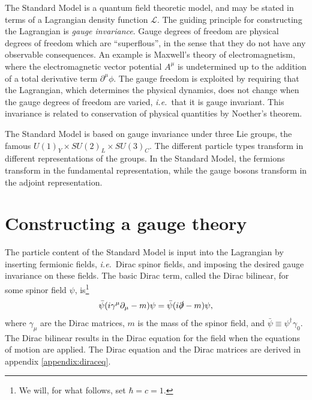 \documentclass[twoside,english]{uiofysmaster}
\begin{document}
The Standard Model is a quantum field theoretic model, and may be stated in terms of a Lagrangian density function $\mathcal{L}$. The guiding principle for constructing the Lagrangian is {\it gauge invariance}. Gauge degrees of freedom are physical degrees of freedom which are ``superflous'', in the sense that they do not have any observable consequences. An example is Maxwell's theory of electromagnetism, where the electromagnetic vector potential $A^\mu$ is undetermined up to the addition of a total derivative term $\partial^\mu \phi$. The gauge freedom is exploited by requiring that the Lagrangian, which determines the physical dynamics, does not change when the gauge degrees of freedom are varied, {\it i.e.}\ that it is gauge invariant. This invariance is related to conservation of physical quantities by Noether's theorem.

The Standard Model is based on gauge invariance under three Lie groups, the famous $U(1)_Y\times SU(2)_L\times SU(3)_C$. The different particle types transform in different representations of the groups. In the Standard Model, the fermions transform in the fundamental representation, while the gauge bosons transform in the adjoint representation.

\section{Constructing a gauge theory}
The particle content of the Standard Model is input into the Lagrangian by inserting fermionic fields, {\it i.e.}\ Dirac spinor fields, and imposing the desired gauge invariance on these fields. The basic Dirac term, called the Dirac bilinear, for some spinor field $\psi$, is\footnote{We will, for what follows, set $\hbar = c = 1$.} 
\begin{align}
	\bar \psi (i\gamma^\mu \partial_\mu - m) \psi = \bar \psi (i\slashed\partial - m)\psi, \label{eq:diracbilinear}
\end{align}
where $\gamma_\mu$ are the Dirac matrices, $m$ is the mass of the spinor field, and $\bar\psi \equiv \psi^\dag \gamma_0$. The Dirac bilinear results in the Dirac equation for the field when the equations of motion are applied. The Dirac equation and the Dirac matrices are derived in appendix \ref{appendix:diraceq}.
\end{document}
